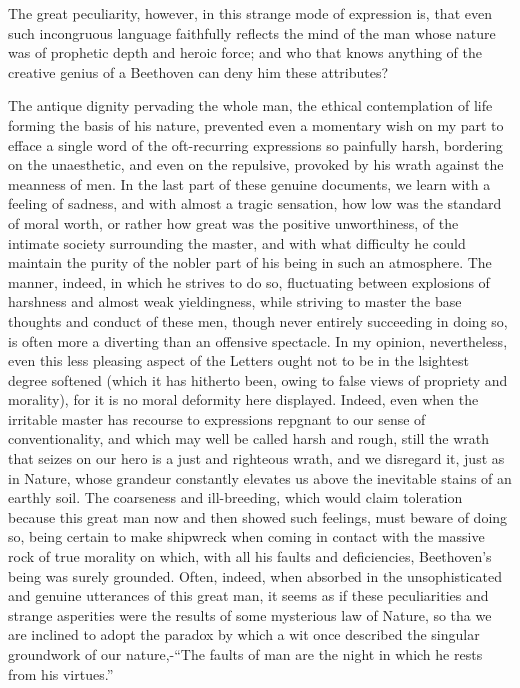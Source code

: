 \documentclass[12pt,oneside]{book}
\begin{document}
The great peculiarity, however, in this strange mode of expression is, that even such incongruous language 
faithfully reflects the mind of the man whose nature was of prophetic depth and heroic force;
and who that knows anything of the creative genius of a Beethoven can deny him these attributes?\par

The antique dignity pervading the whole man, the ethical contemplation of life forming the basis of his nature,
prevented even a momentary wish on my part to efface a single word of the oft-recurring expressions so painfully
harsh, bordering on the unaesthetic, and even on the repulsive, provoked by his wrath against the meanness of men.
In the last part of these genuine documents, we learn with a feeling of sadness, and with almost a tragic sensation,
how low was the standard of moral worth, or rather how great was the positive unworthiness, of the intimate society
surrounding the master, and with what difficulty he could maintain the purity of the nobler part of his being in such
an atmosphere. The manner, indeed, in which he strives to do so, fluctuating between explosions of harshness and almost
weak yieldingness, while striving to master the base thoughts and conduct of these men, though never entirely succeeding
in doing so, is often more a diverting than an offensive spectacle. In my opinion, nevertheless, even this less pleasing
aspect of the Letters ought not to be in the lsightest degree softened (which it has hitherto been, owing to false 
views of propriety and morality), for it is no moral deformity here displayed. Indeed, even when the irritable 
master has recourse to expressions repgnant to our sense of conventionality, and which may well be called harsh and rough, still the wrath that seizes on our hero is a just and righteous wrath, and we disregard it, just as in Nature, whose grandeur constantly elevates us above the inevitable stains of an earthly soil. The coarseness and ill-breeding, which would claim toleration because this great man now and then showed such feelings, must beware of doing so, being certain to make shipwreck when coming in contact with the massive rock of true morality on which, with all his faults and deficiencies, Beethoven's being was surely grounded. Often, indeed, when absorbed in the unsophisticated and genuine utterances of this great man, it seems as if these peculiarities and strange asperities were the results of some mysterious law of Nature, so tha we are inclined to adopt the paradox by which a wit once described the singular groundwork of our nature,-``The faults of man are the night in which he rests from his virtues.'' \par 
\end{document}
